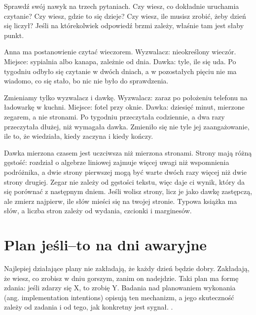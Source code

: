 Sprawdź swój nawyk na trzech pytaniach. Czy wiesz, co dokładnie uruchamia czytanie? Czy wiesz, gdzie to się dzieje? Czy wiesz, ile musisz zrobić, żeby dzień się liczył? Jeśli na którekolwiek odpowiedź brzmi \glqq zależy\grqq{}, właśnie tam jest słaby punkt.

\begin{przyklad}
  Anna ma postanowienie \glqq czytać wieczorem\grqq{}. Wyzwalacz: nieokreślony wieczór. Miejsce: sypialnia albo kanapa, zależnie od dnia. Dawka: \glqq tyle, ile się uda\grqq{}. Po tygodniu odbyło się czytanie w dwóch dniach, a w pozostałych pięciu nie ma wiadomo, co się stało, bo nic nie było do sprawdzenia.

  Zmieniamy tylko wyzwalacz i dawkę. Wyzwalacz: zaraz po położeniu telefonu na ładowarkę w kuchni. Miejsce: fotel przy oknie. Dawka: dziesięć minut, mierzone zegarem, a nie stronami. Po tygodniu przeczytała codziennie, a dwa razy przeczytała dłużej, niż wymagała dawka. Zmieniło się nie tyle jej zaangażowanie, ile to, że wiedziała, kiedy zaczyna i kiedy kończy.
\end{przyklad}

Dawka mierzona czasem jest uczciwsza niż mierzona stronami. Strony mają różną gęstość: rozdział o algebrze liniowej zajmuje więcej uwagi niż wspomnienia podróżnika, a dwie strony pierwszej mogą być warte dwóch razy więcej niż dwie strony drugiej. Zegar nie zależy od gęstości tekstu, więc daje ci wynik, który da się porównać z następnym dniem. Jeśli wolisz strony, licz je jako dawkę zastępczą, ale zmierz najpierw, ile słów mieści się na twojej stronie. Typowa książka ma  słów, a liczba stron zależy od wydania, czcionki i marginesów.

\section{Plan \glqq jeśli--to\grqq{} na dni awaryjne}

Najlepiej działające plany nie zakładają, że każdy dzień będzie dobry. Zakładają, że wiesz, co zrobisz w dniu gorszym, zanim on nadejdzie. Taki plan ma formę zdania: \glqq jeśli zdarzy się X, to zrobię Y\grqq{}. Badania nad planowaniem wykonania (ang. implementation intentions) opisują ten mechanizm, a jego skuteczność zależy od zadania i od tego, jak konkretny jest sygnał. .

